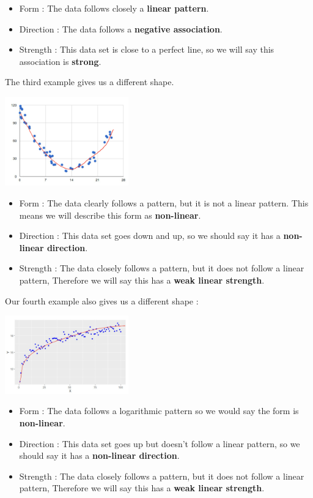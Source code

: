 \documentclass[
  letterpaper,
  DIV=11,
  numbers=noendperiod]{scrreprt}
\providecommand{\tightlist}{%
  \setlength{\itemsep}{0pt}\setlength{\parskip}{0pt}}\usepackage{longtable,booktabs,array}
\begin{document}
\begin{itemize}
\tightlist
\item
  Form : The data follows closely a \textbf{linear pattern}.
\item
  Direction : The data follows a \textbf{negative association}.
\item
  Strength : This data set is close to a perfect line, so we will say
  this association is \textbf{strong}.
\end{itemize}

The third example gives us a different shape.

\includegraphics[width=0.4\textwidth,height=\textheight]{./images/SC_3.jpg}

\begin{itemize}
\tightlist
\item
  Form : The data clearly follows a pattern, but it is not a linear
  pattern. This means we will describe this form as \textbf{non-linear}.
\item
  Direction : This data set goes down and up, so we should say it has a
  \textbf{non-linear direction}.
\item
  Strength : The data closely follows a pattern, but it does not follow
  a linear pattern, Therefore we will say this has a \textbf{weak linear
  strength}.
\end{itemize}

Our fourth example also gives us a different shape :

\includegraphics[width=0.4\textwidth,height=\textheight]{./images/SC_4.jpg}

\begin{itemize}
\tightlist
\item
  Form : The data follows a logarithmic pattern so we would say the form
  is \textbf{non-linear}.
\item
  Direction : This data set goes up but doesn't follow a linear pattern,
  so we should say it has a \textbf{non-linear direction}.
\item
  Strength : The data closely follows a pattern, but it does not follow
  a linear pattern, Therefore we will say this has a \textbf{weak linear
  strength}.
\end{itemize}
\end{document}
